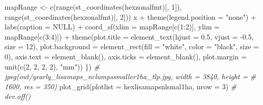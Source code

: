 \documentclass[10pt,landscape,a3paper]{article}
\newenvironment{Shaded}{\begin{snugshade}}{\end{snugshade}}
\newcommand{\AttributeTok}[1]{\textcolor[rgb]{0.77,0.63,0.00}{#1}}
\newcommand{\CommentTok}[1]{\textcolor[rgb]{0.56,0.35,0.01}{\textit{#1}}}
\newcommand{\ConstantTok}[1]{\textcolor[rgb]{0.00,0.00,0.00}{#1}}
\newcommand{\DecValTok}[1]{\textcolor[rgb]{0.00,0.00,0.81}{#1}}
\newcommand{\FloatTok}[1]{\textcolor[rgb]{0.00,0.00,0.81}{#1}}
\newcommand{\FunctionTok}[1]{\textcolor[rgb]{0.00,0.00,0.00}{#1}}
\newcommand{\NormalTok}[1]{#1}
\newcommand{\OtherTok}[1]{\textcolor[rgb]{0.56,0.35,0.01}{#1}}
\newcommand{\SpecialCharTok}[1]{\textcolor[rgb]{0.00,0.00,0.00}{#1}}
\newcommand{\StringTok}[1]{\textcolor[rgb]{0.31,0.60,0.02}{#1}}
\begin{document}
\begin{Shaded}
\begin{Highlighting}[]
\NormalTok{    mapRange }\OtherTok{\textless{}{-}} \FunctionTok{c}\NormalTok{(}\FunctionTok{range}\NormalTok{(}\FunctionTok{st\_coordinates}\NormalTok{(hexzonalfmt)[, }\DecValTok{1}\NormalTok{]), }\FunctionTok{range}\NormalTok{(}\FunctionTok{st\_coordinates}\NormalTok{(hexzonalfmt)[,}
        \DecValTok{2}\NormalTok{]))}
\NormalTok{    x }\SpecialCharTok{+} \FunctionTok{theme}\NormalTok{(}\AttributeTok{legend.position =} \StringTok{"none"}\NormalTok{) }\SpecialCharTok{+} \FunctionTok{labs}\NormalTok{(}\AttributeTok{caption =} \ConstantTok{NULL}\NormalTok{) }\SpecialCharTok{+} \FunctionTok{coord\_sf}\NormalTok{(}\AttributeTok{xlim =}\NormalTok{ mapRange[}\FunctionTok{c}\NormalTok{(}\DecValTok{1}\SpecialCharTok{:}\DecValTok{2}\NormalTok{)],}
        \AttributeTok{ylim =}\NormalTok{ mapRange[}\FunctionTok{c}\NormalTok{(}\DecValTok{3}\SpecialCharTok{:}\DecValTok{4}\NormalTok{)]) }\SpecialCharTok{+} \FunctionTok{theme}\NormalTok{(}\AttributeTok{plot.title =} \FunctionTok{element\_text}\NormalTok{(}\AttributeTok{hjust =} \FloatTok{0.5}\NormalTok{, }\AttributeTok{vjust =} \SpecialCharTok{{-}}\FloatTok{0.5}\NormalTok{,}
        \AttributeTok{size =} \DecValTok{12}\NormalTok{), }\AttributeTok{plot.background =} \FunctionTok{element\_rect}\NormalTok{(}\AttributeTok{fill =} \StringTok{"white"}\NormalTok{, }\AttributeTok{color =} \StringTok{"black"}\NormalTok{,}
        \AttributeTok{size =} \DecValTok{0}\NormalTok{), }\AttributeTok{axis.text =} \FunctionTok{element\_blank}\NormalTok{(), }\AttributeTok{axis.ticks =} \FunctionTok{element\_blank}\NormalTok{(), }\AttributeTok{plot.margin =} \FunctionTok{unit}\NormalTok{(}\FunctionTok{c}\NormalTok{(}\DecValTok{2}\NormalTok{,}
        \DecValTok{2}\NormalTok{, }\DecValTok{2}\NormalTok{, }\DecValTok{2}\NormalTok{), }\StringTok{"mm"}\NormalTok{))}
\NormalTok{\})}
\CommentTok{\# jpeg(\textquotesingle{}out/yearly\_lisamaps\_nclumpssmaller1ha\_tlp.jpg\textquotesingle{}, width = 3840, height =}
\CommentTok{\# 1600, res = 350)}
\FunctionTok{plot\_grid}\NormalTok{(}\AttributeTok{plotlist =}\NormalTok{ hexlisamapsnlsmal1ha, }\AttributeTok{nrow =} \DecValTok{3}\NormalTok{)}
\CommentTok{\# dev.off()}


\end{Highlighting}
\end{Shaded}
\end{document}
